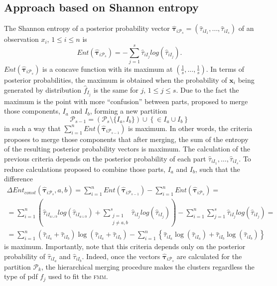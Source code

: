 \documentclass[10pt, a4paper]{article}
\newcommand{\m}[1]{\boldsymbol{#1}}
\newcommand{\fmm}{\textsc{fmm}\xspace}
\begin{document}
\begin{spacing}{1.9}
\subsection{Approach based on Shannon entropy}

The Shannon entropy of a posterior probability vector $\hat{\m\tau}_{i \mathcal{P}_s} = \left( \hat{\tau}_{i I_1} , \dots, \hat{\tau}_{i I_s}  \right)$ of an observation $x_i$, $1 \leq i \leq n$ is
\[
Ent( \hat{\m \tau}_{i \mathcal{P}_s} ) = - \sum_{j=1}^s \hat{\tau}_{i I_j}  log(\hat{\tau}_{i I_j} ).
\]
$Ent( \hat{\m \tau}_{i \mathcal{P}_s} )$ is a concave function with its maximum at $(\frac{1}{s},\dots,\frac{1}{s})$. In terms of posterior probabilities, the maximum is obtained when the probability of $\m x_i$ being generated by distribution $\hat{f}_{I_j}$ is the same for $j$, $1\leq j \leq s$. Due to the fact the maximum is the point with more ``confusion'' between parts, \cite{baudry2010combining} proposed to merge those components, $I_a$ and $I_b$, forming a new partition\[ \mathcal{P}_{s-1} = \left( \mathcal{P}_s \setminus \{ I_a, I_b \} \right) \cup \left\{ \in I_a\cup I_b \right\} \] in such a way that $\sum_{i=1}^n Ent( \hat{\m \tau}_{i \mathcal{P}_{s-1}} )$ is maximum. In other words, the criteria proposes to merge those components that after merging, the sum of the entropy of the resulting posterior probability vectors is maximum. The calculation of the previous criteria depends on the posterior probability of each part $\hat{\tau}_{i I_1}, \dots,\hat{\tau}_{i I_s}$. To reduce calculations \cite{baudry2010combining} proposed to combine those parts, $I_a$ and $I_b$, such that the difference
\begin{multline*}
\Delta Ent_{const}(\hat{\m \tau}_{i \mathcal{P}_s}, a, b) = \sum_{i=1}^n Ent( \hat{\m \tau}_{i \mathcal{P}_{s-1}}) - \sum_{i=1}^n Ent( \hat{\m \tau}_{i \mathcal{P}_s}) =  \\ = \sum_{i=1}^n  \left( \hat{\tau}_{i I_{a\cup b}}  log(\hat{\tau}_{i I_{a\cup b}} ) +  \sum_{\substack{j=1 \\
                                                            j \neq a, b}}^s \hat{\tau}_{i I_j}  log(\hat{\tau}_{i I_j} ) \right)  - \sum_{i=1}^n \sum_{j=1}^s \hat{\tau}_{i I_j}  log(\hat{\tau}_{i I_j} ) = \\  =   \sum_{i=1}^n  (\hat{\tau}_{i I_a}+\hat{\tau}_{i I_b}) \log(\hat{\tau}_{iI_a} + \hat{\tau}_{i I_b}) - \sum_{i=1}^n \left\{ \hat{\tau}_{i I_a} \log(\hat{\tau}_{i I_a}) + \hat{\tau}_{iI_b} \log(\hat{\tau}_{i I_b})\right\}
\end{multline*}
is maximum. Importantly, note that this criteria depends only on the posterior probability of $\hat{\tau}_{iI_a}$ and $\hat{\tau}_{iI_b}$. Indeed, once the vectors $\hat{\m\tau}_{i \mathcal{P}_s}$ are calculated for the partition $\mathcal{P}_k$, the hierarchical merging procedure makes the clusters regardless the type of pdf $f_j$ used to fit the \fmm.


\end{spacing}
\end{document}
